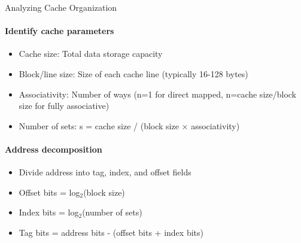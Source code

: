 \begin{KR}{Analyzing Cache Organization}\\
\paragraph{Identify cache parameters}
\begin{itemize}
    \item Cache size: Total data storage capacity
    \item Block/line size: Size of each cache line (typically 16-128 bytes)
    \item Associativity: Number of ways (n=1 for direct mapped, n=cache size/block size for fully associative)
    \item Number of sets: s = cache size / (block size × associativity)
\end{itemize}

\paragraph{Address decomposition}
\begin{itemize}
    \item Divide address into tag, index, and offset fields
    \item Offset bits = log$_2$(block size)
    \item Index bits = log$_2$(number of sets)
    \item Tag bits = address bits - (offset bits + index bits)
\end{itemize}


\end{KR}
